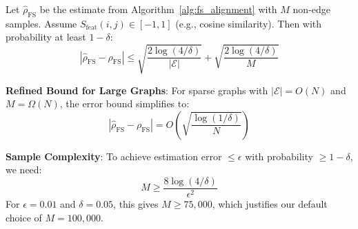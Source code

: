 \begin{theorem}
\label{thm:estimation_error}
Let $\hat{\rho}_{\text{FS}}$ be the estimate from Algorithm~\ref{alg:fs_alignment} with $M$ non-edge samples. Assume $S_{\text{feat}}(i,j) \in [-1, 1]$ (e.g., cosine similarity). Then with probability at least $1 - \delta$:
\begin{equation}
|\hat{\rho}_{\text{FS}} - \rho_{\text{FS}}| \leq \sqrt{\frac{2\log(4/\delta)}{|\mathcal{E}|}} + \sqrt{\frac{2\log(4/\delta)}{M}}
\end{equation}

\textbf{Refined Bound for Large Graphs}: For sparse graphs with $|\mathcal{E}| = O(N)$ and $M = \Omega(N)$, the error bound simplifies to:
\begin{equation}
|\hat{\rho}_{\text{FS}} - \rho_{\text{FS}}| = O\left(\sqrt{\frac{\log(1/\delta)}{N}}\right)
\end{equation}

\textbf{Sample Complexity}: To achieve estimation error $\leq \epsilon$ with probability $\geq 1-\delta$, we need:
\begin{equation}
M \geq \frac{8\log(4/\delta)}{\epsilon^2}
\end{equation}
For $\epsilon = 0.01$ and $\delta = 0.05$, this gives $M \geq 75,000$, which justifies our default choice of $M = 100,000$.
\end{theorem}

